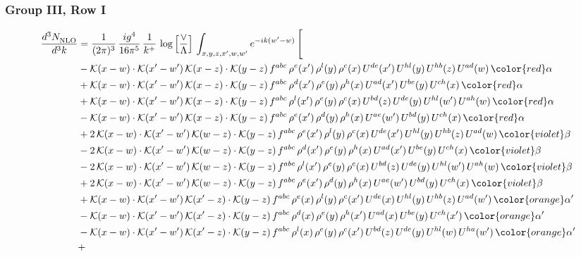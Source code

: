 \subsubsection{Group III, Row I}
\begin{align}
     \frac{d^{3}N_{\rm NLO}^{\rm}}{d^{3}k}  & = \frac{1}{(2\pi)^{3}}\, \frac{ig^{4}}{16\pi^{5}}\, \frac{1}{k^{+}}\, \log{\left[\frac{\vee}{\Lambda}\right]}\, \int_{x,y,z,x^{\prime},w,w^{\prime}}e^{-ik(w^{\prime}-w)}\, \Bigg[\notag \\ & -\mathcal{K}(x-w)\cdot \mathcal{K}(x'-w')\, \mathcal{K}(x-z)\cdot \mathcal{K}(y-z)\, f^{abc}\, \rho^{e}(x')\,\rho^{l}(y)\,\rho^{c}(x)\,U^{de}(x')\,U^{hl}(y)\,U^{hb}(z)\,U^{ad}(w)\, {\color{red}\alpha} \notag \\ & +\mathcal{K}(x-w)\cdot \mathcal{K}(x'-w')\, \mathcal{K}(x-z)\cdot \mathcal{K}(y-z)\, f^{abc}\, \rho^{d}(x')\,\rho^{e}(y)\,\rho^{h}(x)\,U^{ad}(x')\,U^{be}(y)\,U^{ch}(x)\, {\color{red}\alpha} \notag \\ & + \mathcal{K}(x-w)\cdot \mathcal{K}(x'-w')\, \mathcal{K}(x-z)\cdot \mathcal{K}(y-z)\, f^{abc}\, \rho^{l}(x')\,\rho^{e}(y)\,\rho^{c}(x)\,U^{bd}(z)\,U^{de}(y)\,U^{hl}(w')\,U^{ah}(w)\, {\color{red}\alpha} \notag \\ & -\mathcal{K}(x-w)\cdot \mathcal{K}(x'-w')\, \mathcal{K}(x-z)\cdot \mathcal{K}(y-z)\, f^{abc}\, \rho^{e}(x')\,\rho^{d}(y)\,\rho^{h}(x)\,U^{ae}(w')\,U^{bd}(y)\,U^{ch}(x)\, {\color{red}\alpha} \notag \\ & +2\, \mathcal{K}(x-w)\cdot \mathcal{K}(x'-w')\, \mathcal{K}(w-z) \cdot \mathcal{K}(y-z)\, f^{abc}\, \rho^{e}(x')\,\rho^{l}(y)\, \rho^{c}(x)\, U^{de}(x')\,U^{hl}(y)\,U^{hb}(z)\,U^{ad}(w)\, {\color{violet} \beta} \notag \\ & -2\, \mathcal{K}(x-w)\cdot \mathcal{K}(x'-w')\, \mathcal{K}(w-z) \cdot \mathcal{K}(y-z)\, f^{abc}\, \rho^{d}(x')\,\rho^{e}(y)\, \rho^{h}(x)\, U^{ad}(x')\,U^{be}(y)\,U^{ch}(x)\, {\color{violet} \beta}\notag \\ & -2\, \mathcal{K}(x-w)\cdot \mathcal{K}(x'-w')\, \mathcal{K}(w-z) \cdot \mathcal{K}(y-z)\, f^{abc}\, \rho^{l}(x')\,\rho^{e}(y)\, \rho^{c}(x)\, U^{bd}(z)\,U^{de}(y)\,U^{hl}(w')\,U^{ah}(w)\, {\color{violet} \beta}\notag \\ & + 2\, \mathcal{K}(x-w)\cdot \mathcal{K}(x'-w')\, \mathcal{K}(w-z) \cdot \mathcal{K}(y-z)\, f^{abc}\, \rho^{e}(x')\,\rho^{d}(y)\, \rho^{h}(x)\, U^{ae}(w')\,U^{bd}(y)\,U^{ch}(x)\, {\color{violet} \beta}\notag \\ & + \mathcal{K}(x-w)\cdot \mathcal{K}(x'-w')\, \mathcal{K}(x'-z) \cdot \mathcal{K}(y-z)\, f^{abc}\, \rho^{e}(x)\, \rho^{l}(y)\, \rho^{c}(x')\, U^{de}(x)\,U^{hl}(y)\, U^{hb}(z)\,U^{ad}(w')\, {\color{orange} \alpha'} \notag \\ & - \mathcal{K}(x-w)\cdot \mathcal{K}(x'-w')\, \mathcal{K}(x'-z) \cdot \mathcal{K}(y-z)\, f^{abc}\, \rho^{d}(x)\, \rho^{e}(y)\, \rho^{h}(x')\, U^{ad}(x)\,U^{be}(y)\, U^{ch}(x')\, {\color{orange} \alpha'} \notag \\ & - \mathcal{K}(x-w)\cdot \mathcal{K}(x'-w')\, \mathcal{K}(x'-z) \cdot \mathcal{K}(y-z)\, f^{abc}\, \rho^{l}(x)\, \rho^{e}(y)\, \rho^{c}(x')\, U^{bd}(z)\,U^{de}(y)\, U^{hl}(w)\,U^{ha}(w')\, {\color{orange} \alpha'} \notag \\ & + 
\end{align}
